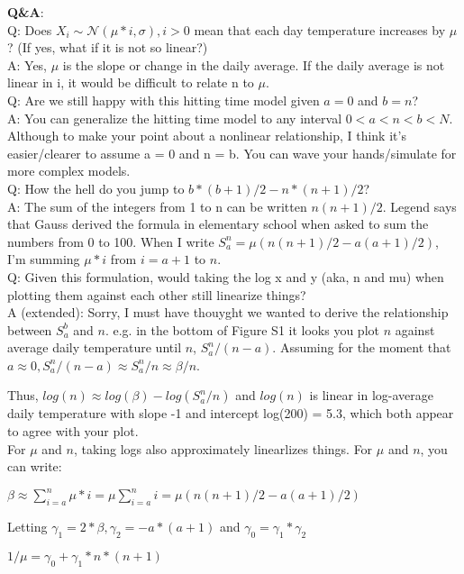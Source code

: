 \documentclass[11pt,letter]{article}
\begin{document}
{\bf Q\&A}:\\
Q: Does $X_i \sim \mathcal{N}(\mu * i, \sigma), i > 0$ mean that each day temperature increases by $\mu$? (If yes, what if it is not so linear?)\\
A: Yes, $\mu$ is the slope or change in the daily average. If the daily average is not linear in i, it would be difficult to relate n to $\mu$.\\

Q: Are we still happy with this hitting time model given $a=0$ and $b=n$?\\
A: You can generalize the hitting time model to any interval $0 < a < n < b < N$. Although to make your point about a nonlinear relationship, I think it's easier/clearer to assume a = 0 and n = b. You can wave your hands/simulate for more complex models.\\

Q: How the hell do you jump to $b * (b + 1) / 2 - n * (n + 1) / 2$?\\
A: The sum of the integers from 1 to n can be written $n(n+1)/2$. Legend says that Gauss derived the formula in elementary school when asked to sum the numbers from 0 to 100. When I write $S_a^n =  \mu (n(n+1)/2 - a(a+1)/2)$, I'm summing $\mu * i$ from $i = a+1$ to $n$.\\

Q: Given this formulation, would taking the log x and y (aka, n and mu) when plotting them against each other still linearize things? \\
A (extended): Sorry, I must have thouyght we wanted to derive the relationship between $S_a^b$ and $n$. e.g. in the bottom of Figure S1 it looks you plot $n$ against average daily temperature until $n$, $S_a^n/(n-a)$. Assuming for the moment that $a \approx 0, S_a^n/(n-a) \approx S_a^n/n  \approx \beta/n$.

Thus, $log(n) \approx log(\beta) - log(S_a^n/n)$ and $log(n)$ is linear in log-average daily temperature with slope -1 and intercept log(200) = 5.3, which both appear to agree with your plot.\\

For $\mu$ and $n$, taking logs also approximately linearlizes things. For $\mu$ and $n$, you can write:

$\beta \approx \sum_{i=a}^n \mu * i = \mu \sum_{i=a}^n i = \mu (n(n+1)/2 - a(a+1)/2)$

Letting $\gamma_1 = 2 * \beta, \gamma_2 = - a * (a + 1)$ and $\gamma_0 = \gamma_1 * \gamma_2$

$1 / \mu = \gamma_0 + \gamma_1 * n * (n+1) $
\end{document}
